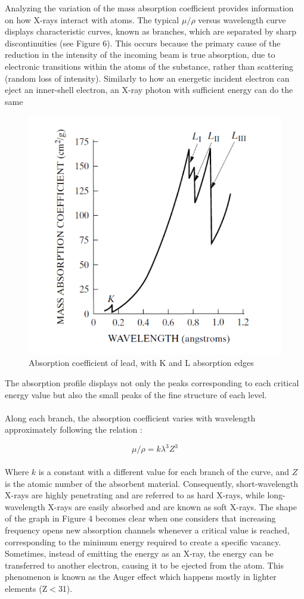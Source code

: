 \documentclass{article}
\begin{document}
Analyzing the variation of the mass absorption coefficient provides information on how X-rays interact with atoms. The typical $\mu/\rho$ versus wavelength curve displays characteristic curves, known as branches, which are separated by sharp discontinuities (see Figure 6). This occurs because the primary cause of the reduction in the intensity of the incoming beam is true absorption, due to electronic transitions within the atoms of the substance, rather than scattering (random loss of intensity). Similarly to how an energetic incident electron can eject an inner-shell electron, an X-ray photon with sufficient energy can do the same

\begin{figure}[h]
    \centering
    \includegraphics[width=0.5\linewidth]{Figures/image1.png}
    \caption{Absorption coefficient of lead, with K and L absorption edges \cite{bernarddeniscullity_2015_elements}}
    \label{fig:enter-label}
\end{figure}

The absorption profile displays not only the peaks corresponding to each critical energy value but also the small peaks of the fine structure of each level.
\\\\
Along each branch, the absorption coefficient varies with wavelength approximately following the relation \cite{bernarddeniscullity_2015_elements}:

\begin{equation}
    \mu/\rho = k\lambda^3 Z^3
\end{equation}
\\
Where $k$ is a constant with a different value for each branch of the curve, and $Z$ is the atomic number of the absorbent material. Consequently, short-wavelength X-rays are highly penetrating and are referred to as hard X-rays, while long-wavelength X-rays are easily absorbed and are known as soft X-rays. The shape of the graph in Figure 4 becomes clear when one considers that increasing frequency opens new absorption channels whenever a critical value is reached, corresponding to the minimum energy required to create a specific vacancy. Sometimes, instead of emitting the energy as an X-ray, the energy can be transferred to another electron, causing it to be ejected from the atom. This phenomenon is known as the Auger effect which happens mostly in lighter elements (Z$<$31).
\end{document}
